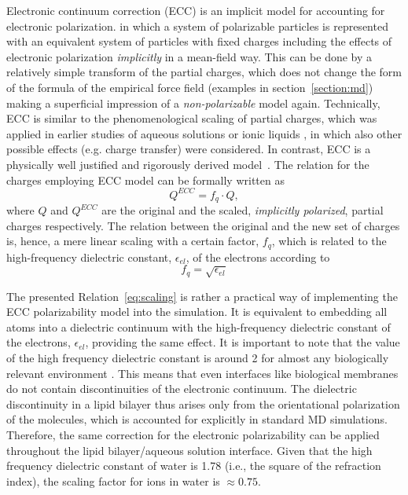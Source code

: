 Electronic continuum correction (ECC) is an implicit model for accounting for electronic polarization. 
in which a system of polarizable particles is represented
with an equivalent system of particles with fixed charges
including the effects of electronic polarization \emph{implicitly} in a mean-field way. \citep{leontyev09, leontyev10, leontyev11, leontyev14}
This can be done by a relatively simple transform of the partial charges,
which does not change the form of the formula of the empirical force field (examples in section~\ref{section:md})
making a superficial impression of a \emph{non-polarizable} model again. 
Technically, ECC is similar to the phenomenological scaling of partial charges, 
which was applied in earlier studies of aqueous solutions or ionic liquids \citep{jonsson86,egberts94,beichel14},
in which also other possible effects (e.g. charge transfer) were considered.
In contrast, ECC is a physically well justified and rigorously derived model~\citep{leontyev09, leontyev10, leontyev11, leontyev14}.
The relation for the charges employing ECC model can be formally written as
\begin{equation}  \label{eq:scaling}
 Q^{ECC} = f_q \cdot Q ,
\end{equation} 
where $Q$ and $Q^{ECC}$ are the original and the scaled, \emph{implicitly polarized}, partial charges respectively. 
The relation between the original and the new set of charges 
is, hence, a mere linear scaling with a certain factor, $f_q$, 
which is related to the high-frequency dielectric constant, $\epsilon _{el}$, of the electrons according to
\begin{equation}   \label{eq:scaling_factor}
 f_q = \sqrt{ \epsilon _{el} }
\end{equation} 

The presented Relation~\ref{eq:scaling} is rather a practical way of implementing the ECC polarizability model into the simulation. 
It is equivalent to embedding all atoms into a dielectric continuum 
with the high-frequency dielectric constant of the electrons, $\epsilon _{el}$, providing the same effect.
It is important to note that the value of the high frequency dielectric constant  
is around 2 for almost any biologically relevant environment \citep{leontyev11}. 
This means that even interfaces like biological membranes do not contain discontinuities of the electronic continuum. 
The dielectric discontinuity in a lipid bilayer thus arises only 
from the orientational polarization of the molecules, which is accounted for explicitly in standard MD simulations.  
Therefore, the same correction for the electronic polarizability can be  
applied throughout the lipid bilayer/aqueous solution interface. 
Given that the  high frequency dielectric constant of water is 1.78 (i.e., the square of the refraction index), 
the scaling factor for ions in water is $\approx 0.75$. 





